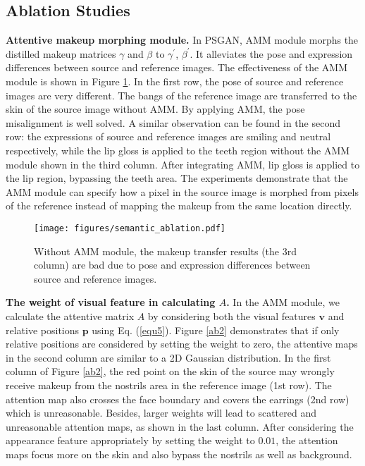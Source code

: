 \subsection{Ablation Studies}

\textbf{Attentive makeup morphing module.}
In PSGAN,  AMM module  morphs the distilled makeup matrices $\gamma$ and $\beta$ to $\gamma^{\prime}$, $\beta^{\prime}$. It alleviates the pose and expression differences between source and reference images. 
The effectiveness of the AMM module is shown in Figure \ref{ab1}.
In the first row,  the pose of source and reference images are very different.  The bangs of the reference image are transferred to the skin of the source image without AMM. By applying AMM, the pose misalignment is well solved. 
A similar observation can be found in the second row: the expressions of source and reference images are smiling and neutral respectively, while the lip gloss is applied to the teeth region without the AMM module shown in the third column. After integrating AMM, lip gloss is applied to the lip region, bypassing the teeth area.
The experiments demonstrate that the AMM module can specify how a pixel in the source image is morphed from pixels of the reference instead of mapping the makeup from the same location directly. 

\begin{figure}[!t]
    \texttt{[image: figures/semantic\_ablation.pdf]}
    \caption{Without AMM module, the  makeup transfer results (the 3rd column) are bad due to pose and expression differences between source and reference images.}
    \label{ab1}
 \end{figure}

\textbf{The weight of visual feature in calculating $A$.} In the AMM module, we calculate the attentive matrix $A$ by considering both the visual features $\mathbf{v}$ and relative positions $\mathbf{p}$ using Eq. (\ref{equ5}). 
Figure \ref{ab2} demonstrates that if only relative positions are considered by setting the weight to zero, the attentive maps in the second column are similar to a 2D Gaussian distribution.
In the first column of Figure \ref{ab2}, the red point on the skin of the source may wrongly receive makeup from the nostrils area in the reference image (1st row). The attention map also crosses the face boundary and covers the earrings (2nd row) which is unreasonable.
Besides, larger weights will lead to scattered and unreasonable attention maps, as shown in the last column.
After considering the appearance feature appropriately by setting the weight to $0.01$, the attention maps focus more on the skin and also bypass the nostrils as well as background.

